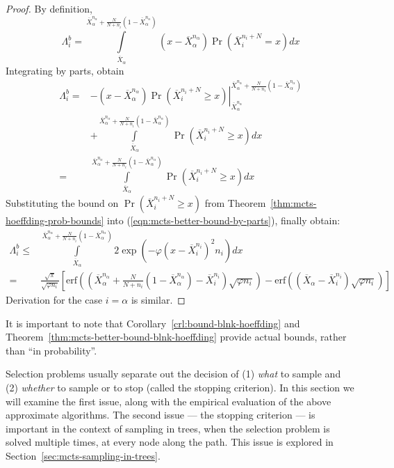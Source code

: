 \begin{proof}By definition,
\begin{equation}
\Lambda_i^b=\int\limits_{\overline X_\alpha}^{\overline X_\alpha^{n_\alpha}+\frac N {N+n_i}(1-\overline X_\alpha^{n_\alpha})}(x-\overline X_\alpha^{n_\alpha})\Pr\left(\overline X_i^{n_i+N}=x\right)dx
\label{eqn:mcts-lambda-blinkered-by-def}
\end{equation}
Integrating by parts, obtain
\begin{align}
\Lambda_i^b=&-\left.(x-\overline X_\alpha^{n_\alpha})\Pr\left(\overline X_i^{n_i+N}\ge x\right)\right|_{\overline X_\alpha^{n_\alpha}}^{\overline X_\alpha^{n_\alpha}+\frac N {N+n_i}(1-\overline X_\alpha^{n_\alpha})}\nonumber\\
&+\int\limits_{\overline X_\alpha}^{\overline X_\alpha^{n_\alpha}+\frac N {N+n_i}(1-\overline X_\alpha^{n_\alpha})}\Pr\left(\overline X_i^{n_i+N}\ge x\right)dx\nonumber\\
=&\int\limits_{\overline X_\alpha}^{\overline X_\alpha^{n_\alpha}+\frac N {N+n_i}(1-\overline X_\alpha^{n_\alpha})}\Pr\left(\overline X_i^{n_i+N}\ge x\right)dx
\label{eqn:mcts-better-bound-by-parts}
\end{align}
Substituting the bound on $\Pr\left(\overline X_i^{n_i+N}\ge x\right)$ from Theorem~\ref{thm:mcts-hoeffding-prob-bounds} into (\ref{eqn:mcts-better-bound-by-parts}), finally obtain:
\begin{align}
\Lambda_i^b\le&\int\limits_{\overline X_\alpha}^{\overline X_\alpha^{n_\alpha}+\frac N {N+n_i}(1-\overline X_\alpha^{n_\alpha})}2\exp\left(-\varphi(x-\overline X_i^{n_i})^2n_i\right)dx\nonumber\\
 =&\frac {\sqrt \pi} {\sqrt {\varphi n_i}}
  \left[\mathrm{erf}\left(\left(\overline X_\alpha^{n_\alpha}+\frac N {N+n_i}(1-\overline X_\alpha^{n_\alpha})-\overline X_i^{n_i}\right)\sqrt {\varphi n_i}\right)-\mathrm{erf}\left((\overline X_\alpha - \overline X_i^{n_i})\sqrt{\varphi n_i}\right)\right]
\end{align}
Derivation for the case $i=\alpha$ is similar.
\end{proof}
\vspace{\baselineskip}
It is important to note that Corollary~\ref{crl:bound-blnk-hoeffding}
and Theorem~\ref{thm:mcts-better-bound-blnk-hoeffding}
provide actual bounds, rather than ``in probability''.

Selection problems usually separate out the decision of (1) {\em what}
to sample and (2) {\em whether} to sample or to stop (called the stopping criterion).
In this section we will examine the first issue, along with the empirical evaluation 
of the above approximate algorithms. The second issue --- the stopping
criterion --- is important in the context of sampling in trees, when the
selection problem is solved multiple times, at every node along the
path. This issue is explored in Section~\ref{sec:mcts-sampling-in-trees}.

